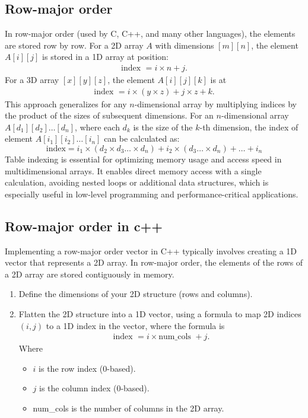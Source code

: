 \documentclass{report}
\begin{document}
\subsection{Row-major order}
\bigbreak \noindent 
In row-major order (used by C, C++, and many other languages), the elements are stored row by row. For a 2D array $A$ with dimensions $[m][n]$, the element $A[i][j]$ is stored in a 1D array at position:
\begin{align*}
    \text{index } = i \times n + j 
.\end{align*}
\bigbreak \noindent 
For a 3D array $[x][y][z]$, the element $A[i][j][k]$ is at
\begin{align*}
    \text{index } = i \times (y \times z ) + j \times z + k
.\end{align*}
\bigbreak \noindent 
This approach generalizes for any $n$-dimensional array by multiplying indices by the product of the sizes of subsequent dimensions.
\bigbreak \noindent 
For an \( n \)-dimensional array \( A[d_1][d_2] \ldots [d_n] \), where each \( d_k \) is the size of the \( k \)-th dimension, the index of element \( A[i_1][i_2] \ldots [i_n] \) can be calculated as:
\bigbreak \noindent 
\[
\text{index} = i_1 \times (d_2 \times d_3 \ldots \times d_n) + i_2 \times (d_3 \ldots \times d_n) + \ldots + i_n
\]
\bigbreak \noindent 
Table indexing is essential for optimizing memory usage and access speed in multidimensional arrays. It enables direct memory access with a single calculation, avoiding nested loops or additional data structures, which is especially useful in low-level programming and performance-critical applications.

\pagebreak 
\subsection{Row-major order in c++}
\bigbreak \noindent 
Implementing a row-major order vector in C++ typically involves creating a 1D vector that represents a 2D array. In row-major order, the elements of the rows of a 2D array are stored contiguously in memory.
\bigbreak \noindent 
\begin{enumerate}
    \item Define the dimensions of your 2D structure (rows and columns).
    \item Flatten the 2D structure into a 1D vector, using a formula to map 2D indices $(i, j)$ to a 1D index in the vector, where the formula is 
        \begin{align*}
            \text{index } = i \times \text{num\_cols } + j
        .\end{align*}
    Where 
    \begin{itemize}
        \item $i$ is the row index (0-based).
        \item $j$ is the column index (0-based).
        \item num\_cols is the number of columns in the 2D array.
    \end{itemize}
\end{enumerate}
\end{document}
